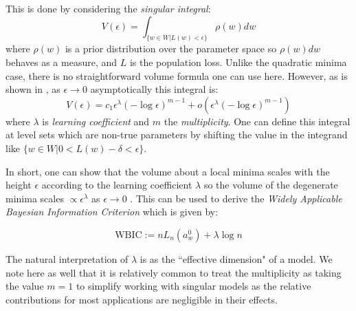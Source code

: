 \documentclass{article} %
\theoremstyle{definition}
\begin{document}
This is done by considering the \textit{singular integral}\citep{Watanabe2009AlgebraicGA}:
\begin{equation}
    V(\epsilon) = \int_{\{w\in W|L(w)<\epsilon\}} \rho(w) dw
\end{equation}
where $\rho(w)$ is a prior distribution over the parameter space so $\rho(w)dw$ behaves as a measure, and $L$ is the population loss. Unlike the quadratic minima case, there is no straightforward volume formula one can use here. However, as is shown in \citep{Watanabe2009AlgebraicGA}, as $\epsilon \to 0$ asymptotically this integral is:
\begin{equation}
    V(\epsilon) = c_1 \epsilon^\lambda(- \log \epsilon)^{m-1} + o(\epsilon^\lambda(- \log \epsilon)^{m-1})
\end{equation}
where $\lambda$ is \textit{learning coefficient} and $m$ the \textit{multiplicity}. One can define this integral at level sets which are non-true parameters by shifting the value in the integrand like $\{w\in W|0<L(w) - \delta <\epsilon\}$.

In short, one can show that the volume about a local minima scales with the height $\epsilon$ according to the learning coefficient $\lambda$ so the volume of the degenerate minima scales $\propto \epsilon^\lambda$ as $\epsilon\to 0$ \citep{Watanabe2009AlgebraicGA}. This can be used to derive the \textit{Widely Applicable Bayesian Information Criterion} \citep{watanabe2012widelyapplicablebayesianinformation} which is given by:

\begin{equation}
    \text{WBIC} := nL_n(a_w^0) + \lambda \log n
\end{equation}

The natural interpretation of $\lambda$ is as the ``effective dimension" of a model. We note here as well that it is relatively common to treat the multiplicity as taking the value $m=1$ to simplify working with singular models as the relative contributions for most applications are negligible in their effects.
\end{document}
